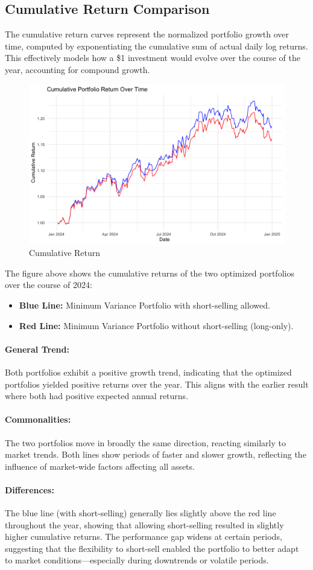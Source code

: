 \documentclass[12pt]{article}
\begin{document}
\subsection*{Cumulative Return Comparison}
The cumulative return curves represent the normalized portfolio growth over time, computed by exponentiating the cumulative sum of actual daily log returns. This effectively models how a \$1 investment would evolve over the course of the year, accounting for compound growth.
\begin{figure} [H]
    \centering
    \includegraphics[width=0.6\linewidth]{Findings_Yutong/cumulative_return.png}
    \caption{Cumulative Return}
    \label{cum-return}
\end{figure}
The figure above shows the cumulative returns of the two optimized portfolios over the course of 2024:
\begin{itemize}
    \item \textbf{Blue Line:} Minimum Variance Portfolio with short-selling allowed.
    \item \textbf{Red Line:} Minimum Variance Portfolio without short-selling (long-only).
\end{itemize}
     \paragraph{General Trend:} Both portfolios exhibit a positive growth trend, indicating that the optimized portfolios yielded positive returns over the year. This aligns with the earlier result where both had positive expected annual returns.
    \paragraph{Commonalities:}The two portfolios move in broadly the same direction, reacting similarly to market trends. Both lines show periods of faster and slower growth, reflecting the influence of market-wide factors affecting all assets.
    \paragraph{Differences:} The blue line (with short-selling) generally lies slightly above the red line throughout the year, showing that allowing short-selling resulted in slightly higher cumulative returns. The performance gap widens at certain periods, suggesting that the flexibility to short-sell enabled the portfolio to better adapt to market conditions—especially during downtrends or volatile periods.
\end{document}

